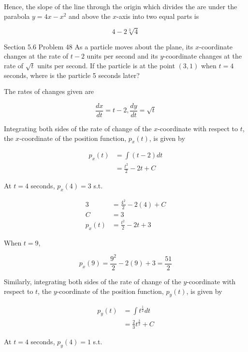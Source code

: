 \documentclass{article}
\begin{document}
    Hence, the slope of the line through the origin which divides the are under the parabola $y=4x-x^2$ and above the $x$-axis into two equal parts is

    \[
        4 - 2\sqrt[3]{4}
    \]

    \begin{tbhtheorem}{Section 5.6 Problem 48}
        As a particle moves about the plane, its $x$-coordinate changes at the rate of $t-2$ units per second and its $y$-coordinate changes at the rate of $\sqrt{t}$ units per second. If the particle is at the point
        $(3,1)$ when $t=4$ seconds, where is the particle 5 seconds later?
    \end{tbhtheorem}

    The rates of changes given are

    \[
        \frac{dx}{dt}=t-2, \frac{dy}{dt}=\sqrt{t}
    \]

    Integrating both sides of the rate of change of the $x$-coordinate with respect to $t$, the $x$-coordinate of the position function, $p_x(t)$, is given by

    \begin{align*}
        p_x(t)  &= \int (t-2)dt \\
                &= \frac{t^2}{2} - 2t + C
    \end{align*}

    At $t=4$ seconds, $p_x(4)=3$ s.t.

    \begin{align*}
        3   &= \frac{4^2}{2} - 2(4) + C \\
        C   &= 3 \\
        p_x (t) &= \frac{t^2}{2} - 2t + 3
    \end{align*}

    \pagebreak
    \thispagestyle{3}

    When $t=9$,

    \[
        p_x(9) = \frac{9^2}{2} - 2(9) + 3 = \frac{51}{2}
    \]

    Similarly, integrating both sides of the rate of change of the $y$-coordinate with respect to $t$, the $y$-coordinate of the position function, $p_y(t)$, is given by

    \begin{align*}
        p_y (t) &= \int t^{\frac{1}{2}}dt \\
                &= \frac{2}{3}t^{\frac{3}{2}} + C
    \end{align*}

    At $t=4$ seconds, $p_y (4) = 1$ s.t.
\end{document}
